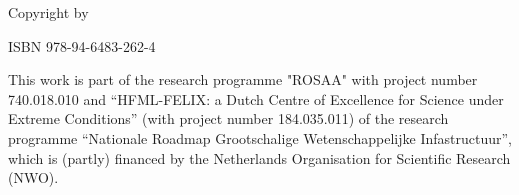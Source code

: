 \noindent Copyright \textcopyright{} \the\year{} by{
    \makeatletter
    \@initials~\@lastname
    \makeatother
}

\medskip
\noindent ISBN 978-94-6483-262-4

\medskip
This work is part of the research programme "ROSAA" with project number 740.018.010 and “HFML-FELIX: a 
Dutch Centre of Excellence for Science under Extreme Conditions” (with project number 184.035.011) of the research 
programme “Nationale Roadmap Grootschalige Wetenschappelijke Infastructuur”, which is (partly) financed by the 
Netherlands Organisation for Scientific Research (NWO).
\cleardoublepage

\thispagestyle{empty}